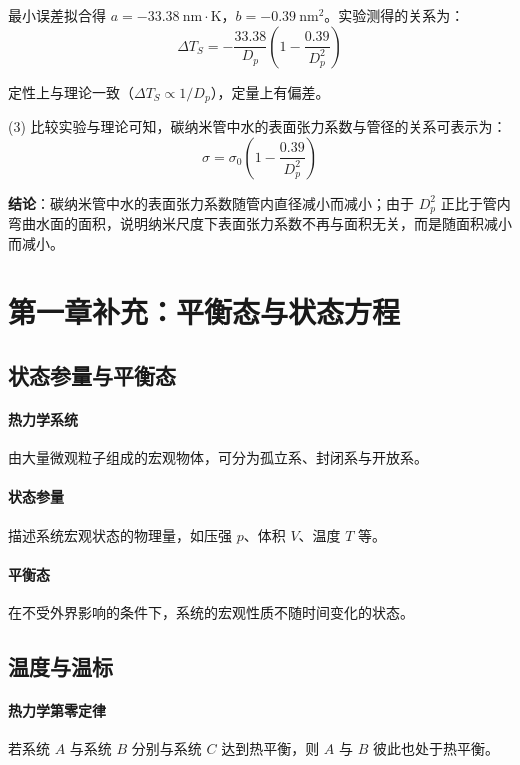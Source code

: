 \documentclass[UTF8]{ctexart}
\begin{document}
最小误差拟合得 $a=-33.38\ \mathrm{nm\cdot K}$，$b=-0.39\ \mathrm{nm^2}$。实验测得的关系为：
\[
\Delta T_S=-\frac{33.38}{D_p}\left(1-\frac{0.39}{D_p^2}\right)
\]

定性上与理论一致（$\Delta T_S\propto 1/D_p$），定量上有偏差。

(3) 比较实验与理论可知，碳纳米管中水的表面张力系数与管径的关系可表示为：
\[
\boxed{\sigma=\sigma_0\left(1-\frac{0.39}{D_p^2}\right)}
\]

\textbf{结论}：碳纳米管中水的表面张力系数随管内直径减小而减小；由于 $D_p^2$ 正比于管内弯曲水面的面积，说明纳米尺度下表面张力系数不再与面积无关，而是随面积减小而减小。

\newpage
\section{第一章补充：平衡态与状态方程}

\subsection{状态参量与平衡态}

\paragraph{热力学系统}
由大量微观粒子组成的宏观物体，可分为孤立系、封闭系与开放系。

\paragraph{状态参量}
描述系统宏观状态的物理量，如压强 $p$、体积 $V$、温度 $T$ 等。

\paragraph{平衡态}
在不受外界影响的条件下，系统的宏观性质不随时间变化的状态。

\subsection{温度与温标}

\paragraph{热力学第零定律}
若系统 $A$ 与系统 $B$ 分别与系统 $C$ 达到热平衡，则 $A$ 与 $B$ 彼此也处于热平衡。
\end{document}
